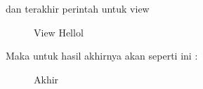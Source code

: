 dan terakhir perintah untuk view

\begin{figure}
\caption{View Hellol}
\label{Gambar 16}
\end{figure}

Maka untuk hasil akhirnya akan seperti ini :
\begin{figure}
\caption{Akhir}
\label{Gambar 17}
\end{figure}



